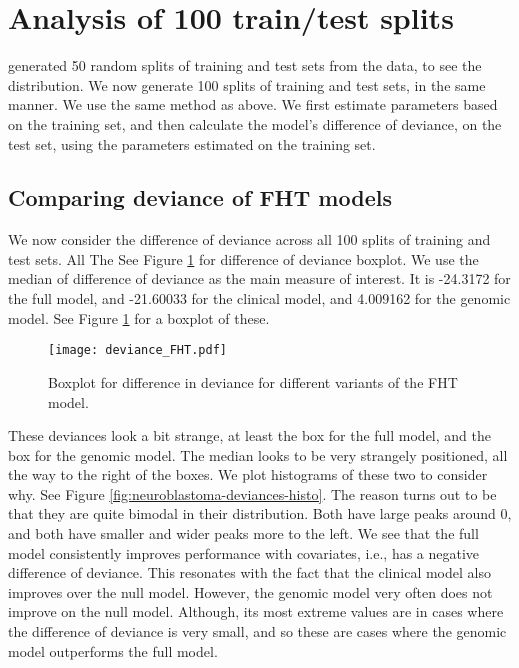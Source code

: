 

\section{Analysis of 100 train/test splits}
\citet{bovelstad2009} generated 50 random splits of training and test sets from the data, to see the distribution.
We now generate 100 splits of training and test sets, in the same manner.
We use the same method as above.
We first estimate parameters based on the training set, and then calculate the model's difference of deviance, on the test set, using the parameters estimated on the training set.

\subsection{Comparing deviance of FHT models}
We now consider the difference of deviance across all 100 splits of training and test sets.
All 
The 
See Figure \ref{fig:neuroblastoma-deviances} for difference of deviance boxplot.
We use the median of difference of deviance as the main measure of interest.
It is -24.3172 for the full model, and -21.60033 for the clinical model, and 4.009162 for the genomic model.
See Figure \ref{fig:neuroblastoma-deviances} for a boxplot of these.

\begin{figure}
\caption{Boxplot for difference in deviance for different variants of the FHT model.}
\label{fig:neuroblastoma-deviances}
\centering
\texttt{[image: deviance\_FHT.pdf]}
\end{figure}

These deviances look a bit strange, at least the box for the full model, and the box for the genomic model.
The median looks to be very strangely positioned, all the way to the right of the boxes.
We plot histograms of these two to consider why.
See Figure \ref {fig:neuroblastoma-deviances-histo}.
The reason turns out to be that they are quite bimodal in their distribution.
Both have large peaks around 0, and both have smaller and wider peaks more to the left.
We see that the full model consistently improves performance with covariates, i.e., has a negative difference of deviance.
This resonates with the fact that the clinical model also improves over the null model.
However, the genomic model very often does not improve on the null model.
Although, its most extreme values are in cases where the difference of deviance is very small, and so these are cases where the genomic model outperforms the full model.

